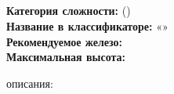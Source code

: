 \begin{samepage}
  \section{\routeTitle}
  \noindent \textbf{Категория сложности:} \routeCategory (\routeType)\\
  \noindent \textbf{Название в классификаторе:} «\routeName»\\
  \noindent \textbf{Рекомендуемое железо:} \routeEquipment\\
  \noindent \textbf{Максимальная высота: } 

  \hspace{1em}
\end{samepage}


\routeDescription{}

\vspace{1em}
\hfill { описания: \routeAuthors}
